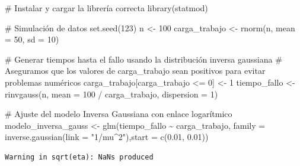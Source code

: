 \documentclass[
  letterpaper,
  DIV=11,
  numbers=noendperiod]{scrreprt}
\newenvironment{Shaded}{\begin{snugshade}}{\end{snugshade}}
\newcommand{\AttributeTok}[1]{\textcolor[rgb]{0.40,0.45,0.13}{#1}}
\newcommand{\CommentTok}[1]{\textcolor[rgb]{0.37,0.37,0.37}{#1}}
\newcommand{\DecValTok}[1]{\textcolor[rgb]{0.68,0.00,0.00}{#1}}
\newcommand{\FloatTok}[1]{\textcolor[rgb]{0.68,0.00,0.00}{#1}}
\newcommand{\FunctionTok}[1]{\textcolor[rgb]{0.28,0.35,0.67}{#1}}
\newcommand{\NormalTok}[1]{\textcolor[rgb]{0.00,0.23,0.31}{#1}}
\newcommand{\OtherTok}[1]{\textcolor[rgb]{0.00,0.23,0.31}{#1}}
\newcommand{\SpecialCharTok}[1]{\textcolor[rgb]{0.37,0.37,0.37}{#1}}
\newcommand{\StringTok}[1]{\textcolor[rgb]{0.13,0.47,0.30}{#1}}
\begin{document}
\begin{tcolorbox}[enhanced jigsaw, breakable, toprule=.15mm, bottomtitle=1mm, coltitle=black, colbacktitle=quarto-callout-tip-color!10!white, titlerule=0mm, opacitybacktitle=0.6, bottomrule=.15mm, toptitle=1mm, title=\textcolor{quarto-callout-tip-color}{\faLightbulb}\hspace{0.5em}{Ejemplo}, arc=.35mm, rightrule=.15mm, opacityback=0, colframe=quarto-callout-tip-color-frame, leftrule=.75mm, left=2mm, colback=white]

\begin{Shaded}
\begin{Highlighting}[]
\CommentTok{\# Instalar y cargar la librería correcta}
\FunctionTok{library}\NormalTok{(statmod)}

\CommentTok{\# Simulación de datos}
\FunctionTok{set.seed}\NormalTok{(}\DecValTok{123}\NormalTok{)}
\NormalTok{n }\OtherTok{\textless{}{-}} \DecValTok{100}
\NormalTok{carga\_trabajo }\OtherTok{\textless{}{-}} \FunctionTok{rnorm}\NormalTok{(n, }\AttributeTok{mean =} \DecValTok{50}\NormalTok{, }\AttributeTok{sd =} \DecValTok{10}\NormalTok{)}

\CommentTok{\# Generar tiempos hasta el fallo usando la distribución inversa gaussiana}
\CommentTok{\# Aseguramos que los valores de carga\_trabajo sean positivos para evitar problemas numéricos}
\NormalTok{carga\_trabajo[carga\_trabajo }\SpecialCharTok{\textless{}=} \DecValTok{0}\NormalTok{] }\OtherTok{\textless{}{-}} \DecValTok{1}
\NormalTok{tiempo\_fallo }\OtherTok{\textless{}{-}} \FunctionTok{rinvgauss}\NormalTok{(n, }\AttributeTok{mean =} \DecValTok{100} \SpecialCharTok{/}\NormalTok{ carga\_trabajo, }\AttributeTok{dispersion =} \DecValTok{1}\NormalTok{)}

\CommentTok{\# Ajuste del modelo Inversa Gaussiana con enlace logarítmico}
\NormalTok{modelo\_inversa\_gauss }\OtherTok{\textless{}{-}} \FunctionTok{glm}\NormalTok{(tiempo\_fallo }\SpecialCharTok{\textasciitilde{}}\NormalTok{ carga\_trabajo, }\AttributeTok{family =} \FunctionTok{inverse.gaussian}\NormalTok{(}\AttributeTok{link =} \StringTok{"1/mu\^{}2"}\NormalTok{),}\AttributeTok{start =} \FunctionTok{c}\NormalTok{(}\FloatTok{0.01}\NormalTok{, }\FloatTok{0.01}\NormalTok{))}
\end{Highlighting}
\end{Shaded}

\begin{verbatim}
Warning in sqrt(eta): NaNs produced
\end{verbatim}


\end{tcolorbox}
\end{document}
